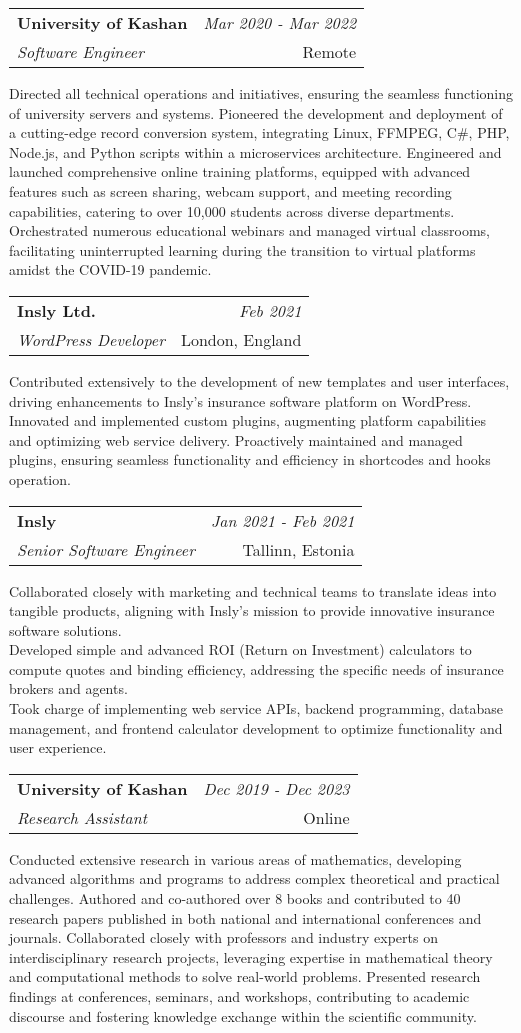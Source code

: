 \documentclass[a4paper,10pt]{article}
\makeatletter
\newcommand{\resumeSubheading}[4]{
	\vspace{0.5mm}\item
	\begin{tabular*}{0.98\textwidth}[t]{l@{\extracolsep{\fill}}r}
		\textbf{#1} & \textit{\footnotesize{#4}} \\
		\textit{\footnotesize{#3}} &  \footnotesize{#2}\\
	\end{tabular*}
	\vspace{-2.4mm}
}
\newcommand{\resumeItemListStart}{\begin{justify}\begin{itemize}[leftmargin=3ex, rightmargin=2ex, noitemsep,labelsep=1.2mm,itemsep=0mm]\small}
\newcommand{\resumeItemListEnd}{\end{itemize}\end{justify}\vspace{-2mm}}
\makeatother
\begin{document}
\vspace{-1mm}
\resumeSubheading
{University of Kashan}{Remote}
{Software Engineer}{Mar 2020 - Mar 2022}
\resumeItemListStart
Directed all technical operations and initiatives, ensuring the seamless functioning of university servers and systems. Pioneered the development and deployment of a cutting-edge record conversion system, integrating Linux, FFMPEG, C\#, PHP, Node.js, and Python scripts within a microservices architecture. Engineered and launched comprehensive online training platforms, equipped with advanced features such as screen sharing, webcam support, and meeting recording capabilities, catering to over 10,000 students across diverse departments. Orchestrated numerous educational webinars and managed virtual classrooms, facilitating uninterrupted learning during the transition to virtual platforms amidst the COVID-19 pandemic.
\resumeItemListEnd

\vspace{-1mm}
\resumeSubheading
{Insly Ltd.}{London, England}
{WordPress Developer}{Feb 2021}
\resumeItemListStart
Contributed extensively to the development of new templates and user interfaces, driving enhancements to Insly's insurance software platform on WordPress. Innovated and implemented custom plugins, augmenting platform capabilities and optimizing web service delivery. Proactively maintained and managed plugins, ensuring seamless functionality and efficiency in shortcodes and hooks operation.
\resumeItemListEnd

\vspace{-1mm}
\resumeSubheading
{Insly}{Tallinn, Estonia}
{Senior Software Engineer}{Jan 2021 - Feb 2021}
\resumeItemListStart
Collaborated closely with marketing and technical teams to translate ideas into tangible products, aligning with Insly's mission to provide innovative insurance software solutions.\\
Developed simple and advanced ROI (Return on Investment) calculators to compute quotes and binding efficiency, addressing the specific needs of insurance brokers and agents.\\
Took charge of implementing web service APIs, backend programming, database management, and frontend calculator development to optimize functionality and user experience.
\resumeItemListEnd

\vspace{-1mm}
\resumeSubheading
{University of Kashan}{Online}
{Research Assistant}{Dec 2019 - Dec 2023}
\resumeItemListStart
Conducted extensive research in various areas of mathematics, developing advanced algorithms and programs to address complex theoretical and practical challenges. Authored and co-authored over 8 books and contributed to 40 research papers published in both national and international conferences and journals. Collaborated closely with professors and industry experts on interdisciplinary research projects, leveraging expertise in mathematical theory and computational methods to solve real-world problems. Presented research findings at conferences, seminars, and workshops, contributing to academic discourse and fostering knowledge exchange within the scientific community. 
\resumeItemListEnd
\end{document}
